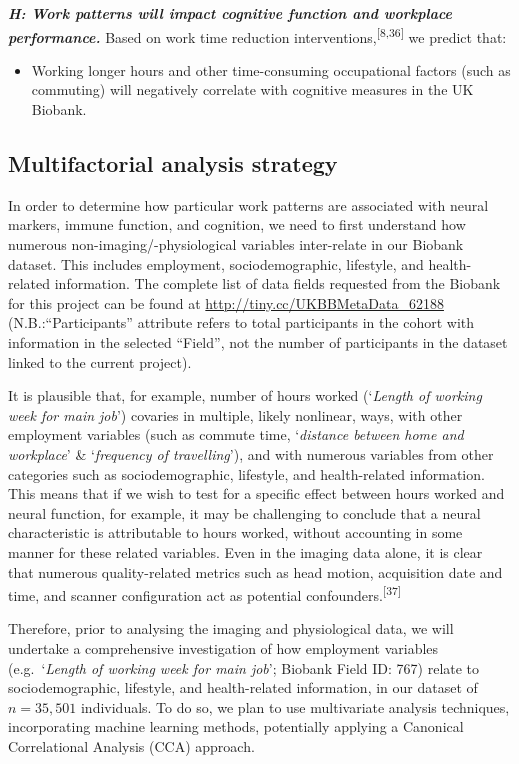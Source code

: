 \documentclass[
  english,
  man, donotrepeattitle]{apa6}
\providecommand{\tightlist}{%
  \setlength{\itemsep}{0pt}\setlength{\parskip}{0pt}}
\begin{document}
\textbf{\emph{H: Work patterns will impact cognitive function and workplace performance.}} Based on work time reduction interventions,\textsuperscript{{[}8,36{]}} we predict that:

\begin{itemize}
\tightlist
\item
  Working longer hours and other time-consuming occupational factors (such as commuting) will negatively correlate with cognitive measures in the UK Biobank.
\end{itemize}

\newpage

\hypertarget{multifactorial-analysis-strategy}{%
\subsection{Multifactorial analysis strategy}\label{multifactorial-analysis-strategy}}

In order to determine how particular work patterns are associated with neural markers, immune function, and cognition, we need to first understand how numerous non-imaging/-physiological variables inter-relate in our Biobank dataset. This includes employment, sociodemographic, lifestyle, and health-related information. The complete list of data fields requested from the Biobank for this project can be found at \url{http://tiny.cc/UKBBMetaData_62188} (N.B.:``Participants'' attribute refers to total participants in the cohort with information in the selected ``Field'', not the number of participants in the dataset linked to the current project).

It is plausible that, for example, number of hours worked (`\emph{Length of working week for main job}') covaries in multiple, likely nonlinear, ways, with other employment variables (such as commute time, `\emph{distance between home and workplace}' \& `\emph{frequency of travelling}'), and with numerous variables from other categories such as sociodemographic, lifestyle, and health-related information. This means that if we wish to test for a specific effect between hours worked and neural function, for example, it may be challenging to conclude that a neural characteristic is attributable to hours worked, without accounting in some manner for these related variables. Even in the imaging data alone, it is clear that numerous quality-related metrics such as head motion, acquisition date and time, and scanner configuration act as potential confounders.\textsuperscript{{[}37{]}}

Therefore, prior to analysing the imaging and physiological data, we will undertake a comprehensive investigation of how employment variables (e.g.~`\emph{Length of working week for main job}'; Biobank Field ID: 767) relate to sociodemographic, lifestyle, and health-related information, in our dataset of \(n=35,501\) individuals. To do so, we plan to use multivariate analysis techniques, incorporating machine learning methods, potentially applying a Canonical Correlational Analysis (CCA) approach.
\end{document}
